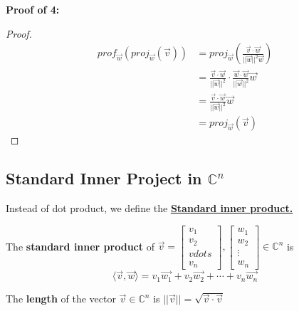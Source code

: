 \documentclass[11pt]{article}
\theoremstyle{plain}
\theoremstyle{remark}
\theoremstyle{plain}
\newcommand{\bd}{\textbf}
\begin{document}
\bd{Proof of 4:}
\begin{proof}
\begin{align*}
    prof_{\overrightarrow{w}}(proj_{\overrightarrow{w}}(\overrightarrow{v})) &= proj_{\overrightarrow{w}}(\frac{\overrightarrow{v}\cdot\overrightarrow{w}}{||\overrightarrow{w}||^2\overrightarrow{w}}) \\
    &=\frac{\overrightarrow{v}\cdot \overrightarrow{w}}{||\overrightarrow{w}||^2}\cdot \frac{\overrightarrow{w}\cdot\overrightarrow{w}}{||\overrightarrow{w}||^2}\overrightarrow{w} \\
    &=\frac{\overrightarrow{v}\cdot\overrightarrow{w}}{||\overrightarrow{w}||^2}\overrightarrow{w} \\
    &=proj_{\overrightarrow{w}}(\overrightarrow{v})
\end{align*}
\end{proof}

\subsection*{Standard Inner Project in $\mathbb{C}^n$}
Instead of dot product, we define the \underline{\bd{Standard inner product.}}

\begin{tcolorbox}[colback=green!5!white,colframe=green!75!black,title=Definition]
    The \bd{standard inner product} of $\overrightarrow{v} = \begin{bmatrix}
        v_1\\v_2\\vdots\\v_n
    \end{bmatrix}, \begin{bmatrix}
        w_1\\w_2\\\vdots\\w_n
    \end{bmatrix}\in \mathbb{C}^n$ is \[\langle \overrightarrow{v}, \overrightarrow{w} \rangle = v_1\overrightarrow{w_1} + v_2\overrightarrow{w_2} + \cdots + v_n\overrightarrow{w_n}\]
\end{tcolorbox}  

\begin{tcolorbox}[colback=green!5!white,colframe=green!75!black,title=Definition]
    The \bd{length} of the vector $\overrightarrow{v}\in\mathbb{C}^n$ is $||\overrightarrow{v}|| = \sqrt{\overrightarrow{v}\cdot\overrightarrow{v}}$
\end{tcolorbox} 
\end{document}
